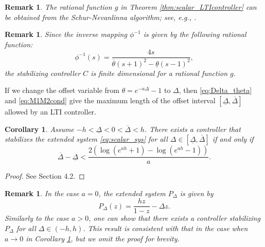 \documentclass[letterpaper, 12pt, draftcls, onecolumn]{ieeeconf}
\newtheorem{remark}[theorem]{Remark}
\newtheorem{corollary}[theorem]{Corollary}
\begin{document}
\begin{remark}
	The rational function $g$ in Theorem \ref{thm:scalar_LTIcontroller}
	can be obtained from the Schur-Nevanlinna algorithm; see, e.g., 
	\cite{luxemburg2010, wakaiki2012}.
\end{remark}	

\begin{remark}
	\label{rem:related_work}
	Since the inverse mapping $\phi^{-1}$ is given by
	the following rational function:
	\begin{equation}
	\label{eq:phi_inv}
	\phi^{-1}(s) = \frac{4s}{\overline \theta (s+1)^2 
		- \underline \theta (s-1)^2},
	\end{equation}
	the stabilizing controller $C$ is finite dimensional for 
	a rational function $g$.
\end{remark}


If we change the offset variable from $\theta = e^{-a\Delta} - 1$ to $\Delta$,
then \eqref{eq:Delta_theta} and \eqref{eq:M1M2cond} give
the maximum 
length of the offset interval $[\underline \Delta, \overline \Delta]$ allowed 
by an LTI controller.
\begin{corollary}
	\label{coro:maximum_length}
	Assume $-h < \underline \Delta < 0 < \overline \Delta < h$.
	There exists a controller that stabilizes 
	the extended system \eqref{eq:scalar_sys}
	for all $\Delta \in [\underline \Delta, \overline \Delta]$ if and only if 
\begin{equation}
	\label{eq:Delt_bound_scalar}
	\overline \Delta - \underline \Delta < 
	\frac{2	\left( \log(e^{ah}+1) - \log(e^{ah}-1) \right)}{a}.
	\end{equation}
\end{corollary}
\begin{proof}
	See Section 4.2.
\end{proof}

\begin{remark}	
	\label{rem:a_equal_zero}	
	In the case $a=0$, the extended system $P_{\Delta}$ is given by
	\begin{equation*}
	P_{\Delta}(z) = 
	\frac{hz}{1-z} - \Delta z.
	\end{equation*}
	Similarly to the case $a>0$, one can show that
	there exists a controller stabilizing $P_{\Delta}$
	for all $\Delta \in (-h,h)$.
	This result is consistent with that in the case when
	$a \to 0$ in
	Corollary \ref{coro:maximum_length}, but
	we omit the proof for brevity.
\end{remark}
\end{document}

